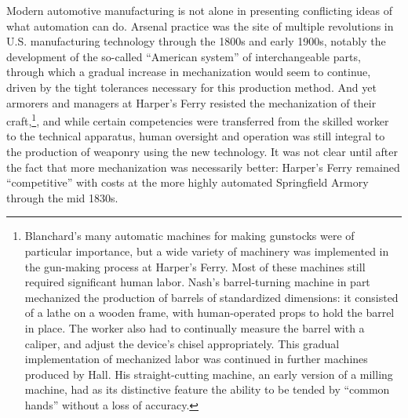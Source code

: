 Modern automotive manufacturing is not alone in presenting conflicting ideas
of what automation can do. Arsenal practice was the site of multiple revolutions in U.S.
manufacturing technology through the 1800s and early 1900s, notably
the development of the so-called ``American system'' of interchangeable
parts, through which a gradual increase in mechanization would seem to
continue, driven by the tight tolerances necessary for this production
method. And yet armorers and managers at Harper's Ferry resisted the
mechanization of their craft,\footnote{Blanchard's many automatic
  machines for making gunstocks were of particular
  importance,\cite[p. 56]{roesmithHarpers} but a wide variety of machinery
  was implemented in the gun-making process at Harper's Ferry. Most of
 these machines still required significant human labor. Nash's
 barrel-turning machine in part mechanized the production of barrels
 of standardized dimensions: it consisted of a lathe on a wooden
 frame, with human-operated props to hold the barrel in
 place.\cite[p. 119]{roesmithHarpers} The worker also had to continually
 measure the barrel with a caliper, and adjust the device's chisel
 appropriately.\cite[p. 121]{roesmithHarpers} This gradual implementation of
 mechanized labor was continued in further machines produced by Hall.
 His straight-cutting machine, an early version of a milling machine,
 had as its distinctive feature the ability to be tended by ``common
 hands'' without a loss of
accuracy.\cite[p. 239]{roesmithHarpers}}, and while certain competencies were
transferred from the skilled worker
to the technical apparatus, human oversight and operation was still
integral to the production of weaponry using the new technology. It was
not clear until after the fact that more mechanization was necessarily
better: Harper's Ferry remained ``competitive'' with
costs at the more highly automated Springfield Armory through the mid
1830s.\cite[p. 324]{roesmithHarpers} 

